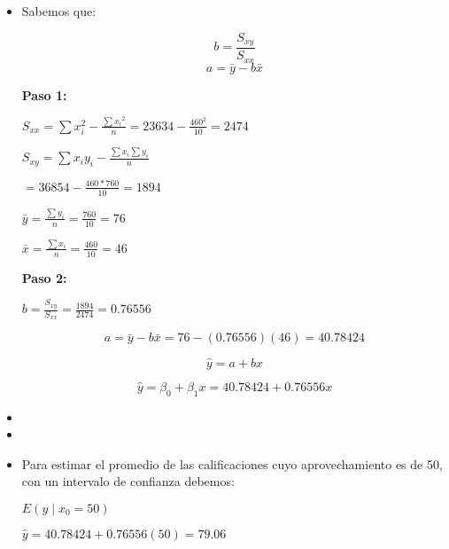 \documentclass{../oxmathproblems}
\begin{document}
\begin{questions}


\miquestion 
\begin{itemize}
\item 
Sabemos que: 


$$ b = \frac{S_{xy}}{S_{xx}} $$   
$$a = \bar{y} - b\bar{x}$$


\textbf {Paso 1: }

$ S_{xx} = \sum{x_i^2} - \frac{\sum{x_i}^2}{n} = 23 634 - \frac{460^2}{10} = 2474$

$ S_{xy} = \sum{x_iy_i} - \frac{\sum{x_i}\sum{y_i}}{n} $

$ = 36 854 - \frac{460*760}{10} = 1894 $ 


$ \bar{y} = \frac{\sum{y_i}}{n} = \frac{760}{10} = 76 $ 

$  \bar{x} = \frac{\sum{x_i}}{n} = \frac{460}{10} = 46$ 


\textbf {Paso 2: }

$ b = \frac{S_{xy}}{S_{xx}}  = \frac{1894}{2474} = 0.76556 $


$$a = \bar{y} - b\bar{x} = 76 - (0.76556)(46) = 40.78424 $$



$$ \hat{y} = a + bx $$  

 
$$ \hat{y} = \beta_0 + \beta_1x = 40.78424 + 0.76556x$$ 
\item %


\item %


\item Para estimar el promedio de las calificaciones cuyo aprovechamiento es de 50, con un intervalo de confianza debemos: 

  $ E(y\mid x_0 = 50) $ 

$ \hat{y} = 40.78424 + 0.76556(50) = 79.06 $ 
\end{itemize} 


\end{questions}
\end{document}
